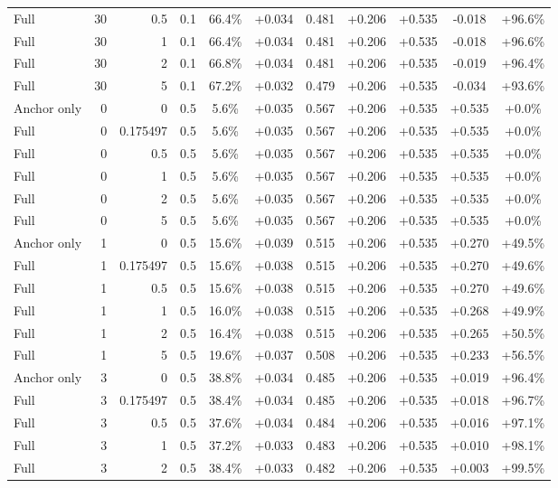 \begin{table}[htbp]
\begin{tabular}{lrrrccccccc}
Full & 30 & 0.5 & 0.1 & 66.4\% & +0.034 & 0.481 & +0.206 & +0.535 & -0.018 & +96.6\% \\
Full & 30 & 1 & 0.1 & 66.4\% & +0.034 & 0.481 & +0.206 & +0.535 & -0.018 & +96.6\% \\
Full & 30 & 2 & 0.1 & 66.8\% & +0.034 & 0.481 & +0.206 & +0.535 & -0.019 & +96.4\% \\
Full & 30 & 5 & 0.1 & 67.2\% & +0.032 & 0.479 & +0.206 & +0.535 & -0.034 & +93.6\% \\
Anchor only & 0 & 0 & 0.5 & 5.6\% & +0.035 & 0.567 & +0.206 & +0.535 & +0.535 & +0.0\% \\
Full & 0 & 0.175497 & 0.5 & 5.6\% & +0.035 & 0.567 & +0.206 & +0.535 & +0.535 & +0.0\% \\
Full & 0 & 0.5 & 0.5 & 5.6\% & +0.035 & 0.567 & +0.206 & +0.535 & +0.535 & +0.0\% \\
Full & 0 & 1 & 0.5 & 5.6\% & +0.035 & 0.567 & +0.206 & +0.535 & +0.535 & +0.0\% \\
Full & 0 & 2 & 0.5 & 5.6\% & +0.035 & 0.567 & +0.206 & +0.535 & +0.535 & +0.0\% \\
Full & 0 & 5 & 0.5 & 5.6\% & +0.035 & 0.567 & +0.206 & +0.535 & +0.535 & +0.0\% \\
Anchor only & 1 & 0 & 0.5 & 15.6\% & +0.039 & 0.515 & +0.206 & +0.535 & +0.270 & +49.5\% \\
Full & 1 & 0.175497 & 0.5 & 15.6\% & +0.038 & 0.515 & +0.206 & +0.535 & +0.270 & +49.6\% \\
Full & 1 & 0.5 & 0.5 & 15.6\% & +0.038 & 0.515 & +0.206 & +0.535 & +0.270 & +49.6\% \\
Full & 1 & 1 & 0.5 & 16.0\% & +0.038 & 0.515 & +0.206 & +0.535 & +0.268 & +49.9\% \\
Full & 1 & 2 & 0.5 & 16.4\% & +0.038 & 0.515 & +0.206 & +0.535 & +0.265 & +50.5\% \\
Full & 1 & 5 & 0.5 & 19.6\% & +0.037 & 0.508 & +0.206 & +0.535 & +0.233 & +56.5\% \\
Anchor only & 3 & 0 & 0.5 & 38.8\% & +0.034 & 0.485 & +0.206 & +0.535 & +0.019 & +96.4\% \\
Full & 3 & 0.175497 & 0.5 & 38.4\% & +0.034 & 0.485 & +0.206 & +0.535 & +0.018 & +96.7\% \\
Full & 3 & 0.5 & 0.5 & 37.6\% & +0.034 & 0.484 & +0.206 & +0.535 & +0.016 & +97.1\% \\
Full & 3 & 1 & 0.5 & 37.2\% & +0.033 & 0.483 & +0.206 & +0.535 & +0.010 & +98.1\% \\
Full & 3 & 2 & 0.5 & 38.4\% & +0.033 & 0.482 & +0.206 & +0.535 & +0.003 & +99.5\% \\

\end{tabular}
\end{table}
